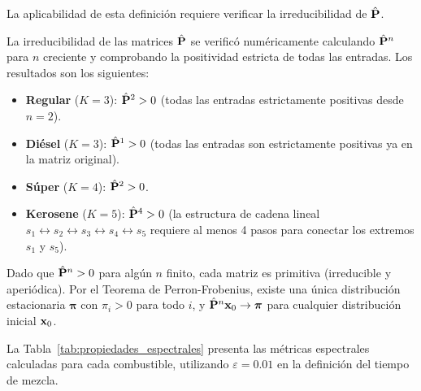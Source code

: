 La aplicabilidad de esta definición requiere verificar la
irreducibilidad de $\hat{\mathbf{P}}$.

\begin{remark}
\label{obs:irreducibilidad}
La irreducibilidad de las matrices $\hat{\mathbf{P}}$ se verificó
numéricamente calculando $\hat{\mathbf{P}}^n$ para $n$ creciente
y comprobando la positividad estricta de todas las entradas.
Los resultados son los siguientes:
\begin{itemize}
    \item \textbf{Regular} ($K=3$): $\hat{\mathbf{P}}^2 > 0$
    (todas las entradas estrictamente positivas desde $n=2$).
    \item \textbf{Diésel} ($K=3$): $\hat{\mathbf{P}}^1 > 0$
    (todas las entradas son estrictamente positivas ya en la matriz original).
    \item \textbf{Súper} ($K=4$): $\hat{\mathbf{P}}^2 > 0$.
    \item \textbf{Kerosene} ($K=5$): $\hat{\mathbf{P}}^4 > 0$
    (la estructura de cadena lineal $s_1 \leftrightarrow s_2 \leftrightarrow s_3
    \leftrightarrow s_4 \leftrightarrow s_5$ requiere al menos 4 pasos para
    conectar los extremos $s_1$ y $s_5$).
\end{itemize}
Dado que $\hat{\mathbf{P}}^n > 0$ para algún $n$ finito, cada
matriz es primitiva (irreducible y aperiódica).  Por el Teorema
de Perron-Frobenius, existe una única distribución estacionaria
$\boldsymbol{\pi}$ con $\pi_i > 0$ para todo $i$, y
$\hat{\mathbf{P}}^n \mathbf{x}_0 \to \boldsymbol{\pi}$ para
cualquier distribución inicial $\mathbf{x}_0$.
\end{remark}

La Tabla~\ref{tab:propiedades_espectrales} presenta las métricas
espectrales calculadas para cada combustible, utilizando
$\varepsilon = 0.01$ en la definición del tiempo de mezcla.

\begin{table}[H]
\centering
\caption{Propiedades espectrales y distribuciones estacionarias de las matrices de transición.}
\label{tab:propiedades_espectrales}
\end{table}

